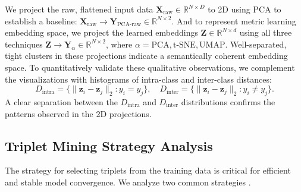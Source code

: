 \documentclass[a4paper,12pt,reqno]{amsart}
\theoremstyle{definition}
\theoremstyle{remark}
\begin{document}
We project the raw, flattened input data $\mathbf{X}_{\text{raw}} \in \mathbb{R}^{N \times D}$ to 2D using PCA to establish a baseline: $\mathbf{X}_{\text{raw}} \rightarrow \mathbf{Y}_{\text{PCA-raw}} \in \mathbb{R}^{N \times 2}$.
And to represent metric learning embedding space, we project the learned embeddings $\mathbf{Z} \in \mathbb{R}^{N \times d}$ using all three techniques $ \mathbf{Z} \rightarrow   \mathbf{Y}_{\alpha} \in \mathbb{R}^{N \times 2}$, where $\alpha = {\text{PCA}}, {\text{t-SNE}}, {\text{UMAP}} $.
Well-separated, tight clusters in these projections indicate a semantically coherent embedding space. To quantitatively validate these qualitative observations, we complement the visualizations with histograms of intra-class and inter-class distances:
\begin{equation}
D_{\text{intra}} = \{ \|\mathbf{z}_i - \mathbf{z}_j\|_2 : y_i = y_j \}, \quad D_{\text{inter}} = \{ \|\mathbf{z}_i - \mathbf{z}_j\|_2 : y_i \neq y_j \}.
\end{equation}
A clear separation between the $D_{\text{intra}}$ and $D_{\text{inter}}$ distributions confirms the patterns observed in the 2D projections.

\subsection{Triplet Mining Strategy Analysis}
The strategy for selecting triplets from the training data is critical for efficient and stable model convergence. We analyze two common strategies \cites{schroff2015facenet,wang2019multi,hermans2017defense}.
\end{document}
